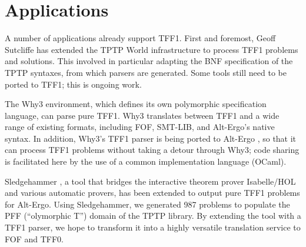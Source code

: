 \section{Applications}
\label{sec_apps}

A number of applications already support TFF1. First and foremost, Geoff
Sutcliffe has extended the TPTP World infrastructure to process TFF1 problems
and solutions. This involved in particular adapting the BNF specification of the
TPTP syntaxes, from which parsers are generated. Some tools still need to be
ported to TFF1; this is ongoing work.

The Why3 \cite{bobot-et-al-2011} environment, which defines its own polymorphic
specification language, can parse pure TFF1. Why3 translates
between TFF1 and a wide range of existing formats, including FOF, SMT-LIB, and
Alt-Ergo's native syntax. In addition, Why3's TFF1 parser is being ported to
Alt-Ergo \cite{bobot-et-al-2008}, so that it can process TFF1 problems without
taking a detour through Why3; code sharing is facilitated here by the use of
a common implementation language (OCaml).

Sledgehammer \cite{paulson-blanchette-2010}, a tool that bridges the interactive
theorem prover Isabelle\slash HOL and various automatic provers, has been
extended to output pure TFF1 problems for Alt-Ergo. Using Sledgehammer, we
generated 987 problems to populate the PFF (``olymorphic T'')
domain of the TPTP library. By extending the tool with a TFF1 parser,
we hope to transform it into a highly versatile translation service to FOF and
TFF0.



